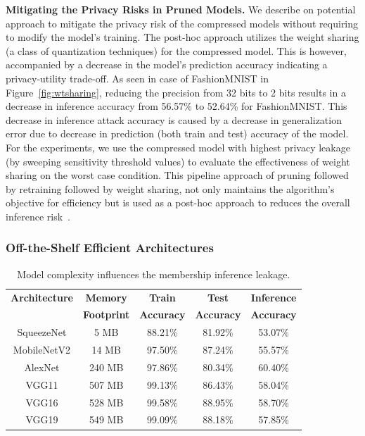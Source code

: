 \textbf{Mitigating the Privacy Risks in Pruned Models.} We describe on potential approach to mitigate the privacy risk of the compressed models without requiring to modify the model's training.
The post-hoc approach utilizes the weight sharing (a class of quantization techniques) for the compressed model. This is however, accompanied by a decrease in the model's prediction accuracy indicating a privacy-utility trade-off.
As seen in case of FashionMNIST in Figure~\ref{fig:wtsharing}, reducing the precision from 32 bits to 2 bits results in a decrease in inference accuracy from 56.57\% to 52.64\% for FashionMNIST.
This decrease in inference attack accuracy is caused by a decrease in generalization error due to decrease in prediction (both train and test) accuracy of the model.
For the experiments, we use the compressed model with highest privacy leakage (by sweeping sensitivity threshold values) to evaluate the effectiveness of weight sharing on the worst case condition.
This pipeline approach of pruning followed by retraining followed by weight sharing, not only maintains the algorithm's objective for efficiency but is used as a post-hoc approach to reduces the overall inference risk~\cite{DBLP:journals/corr/HanMD15,DBLP:journals/corr/HanPNMTECTD16}.






\subsubsection{Off-the-Shelf Efficient Architectures}


\begin{table}[!htb]
\begin{center}
\renewcommand\arraystretch{1.5}
\fontsize{6.7pt}{6.7pt}\selectfont
\begin{tabular}{|c|c|c|c|c|}
\hline
\textbf{Architecture} & \textbf{Memory} & \textbf{Train}  & \textbf{Test}  & \textbf{Inference}   \\
 & \textbf{Footprint} & \textbf{Accuracy} & \textbf{Accuracy} & \textbf{Accuracy}  \\
\hline
SqueezeNet & 5 MB & 88.21\% & 81.92\% & \cellcolor{green!25}53.07\% \\
MobileNetV2 & 14 MB & 97.50\% & 87.24\% & \cellcolor{green!25}55.57\% \\
\hline
AlexNet & 240 MB & 97.86\% & 80.34\% & \cellcolor{red!25}60.40\% \\
VGG11 & 507 MB & 99.13\% & 86.43\% & \cellcolor{red!25}58.04\% \\
VGG16 & 528 MB & 99.58\% & 88.95\% & \cellcolor{red!25}58.70\%  \\
VGG19 & 549 MB & 99.09\% & 88.18\% & \cellcolor{red!25}57.85\% \\
\hline
\end{tabular}
\end{center}
\caption{Model complexity influences the membership inference leakage.}
\label{stdarch}
\end{table}

